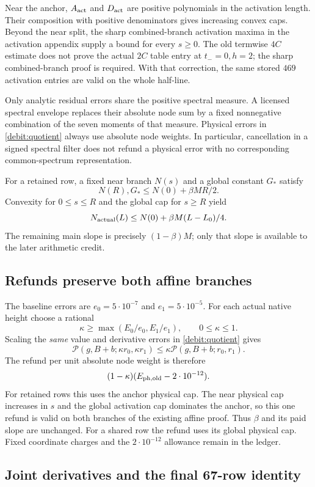 \documentclass[11pt,a4paper]{article}
\theoremstyle{definition}
\theoremstyle{remark}
\begin{document}
Near the anchor, $A_{\rm act}$ and $D_{\rm act}$ are positive
polynomials in the activation length. Their composition with positive
denominators gives increasing convex caps. Beyond the near split, the
sharp combined-branch activation maxima in the activation appendix
supply a bound for every $s\ge0$. The old termwise $4C$ estimate does
not prove the actual $2C$ table entry at $t_-=0,h=2$; the sharp
combined-branch proof is required. With that correction, the same
stored $469$ activation entries are valid on the whole half-line.

Only analytic residual errors share the positive spectral measure. A
licensed spectral envelope replaces their absolute node sum by a fixed
nonnegative combination of the seven moments of that measure.
Physical errors in \eqref{debit:quotient} always use absolute node
weights. In particular, cancellation in a signed spectral filter does
not refund a physical error with no corresponding common-spectrum
representation.

For a retained row, a fixed near branch $N(s)$ and a global constant
$G_*$ satisfy
\[
 N(R),G_*\le N(0)+\beta MR/2.
\]
Convexity for $0\le s\le R$ and the global cap for $s\ge R$ yield
\[
 N_{\rm actual}(L)\le N(0)+\beta M(L-L_0)/4.
\]
The remaining main slope is precisely $(1-\beta)M$; only that slope
is available to the later arithmetic credit.

\subsection{Refunds preserve both affine branches}

The baseline errors are $e_0=5\cdot10^{-7}$ and
$e_1=5\cdot10^{-5}$. For each actual native height choose a rational
\[
 \kappa\ge\max(E_0/e_0,E_1/e_1),\qquad 0\le\kappa\le1.
\]
Scaling the \emph{same} value and derivative errors in
\eqref{debit:quotient} gives
\[
 \mathcal P(g,B+b;\kappa r_0,\kappa r_1)
 \le\kappa\mathcal P(g,B+b;r_0,r_1).
\]
The refund per unit absolute node weight is therefore
\[
 (1-\kappa)(E_{\rm ph,old}-2\cdot10^{-12}).
\]
For retained rows this uses the anchor physical cap. The near physical
cap increases in $s$ and the global activation cap dominates the anchor,
so this one refund is valid on both branches of the existing affine
proof. Thus $\beta$ and its paid slope are unchanged. For a shared row
the refund uses its global physical cap. Fixed coordinate charges and
the $2\cdot10^{-12}$ allowance remain in the ledger.

\subsection{Joint derivatives and the final 67-row identity}
\end{document}
